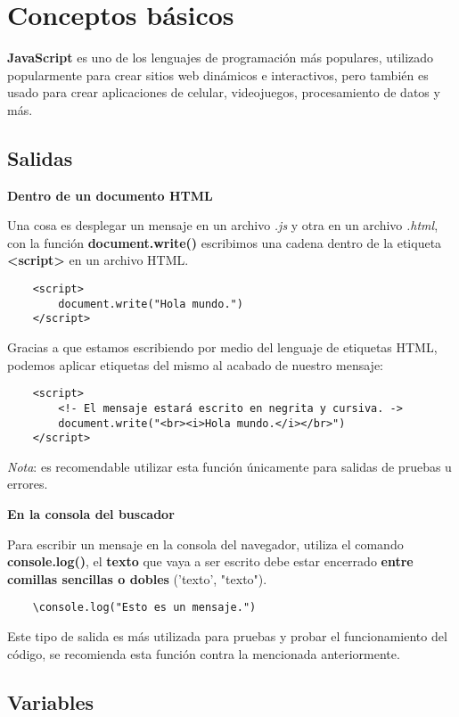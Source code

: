 \section{Conceptos básicos}

\textbf{JavaScript} es uno de los lenguajes de programación más populares, utilizado popularmente para crear sitios web dinámicos e interactivos, pero también es usado para crear aplicaciones de celular, videojuegos, procesamiento de datos y más.


\subsection{Salidas}

\textbf{Dentro de un documento HTML}

Una cosa es desplegar un mensaje en un archivo \textit{.js} y otra en un archivo \textit{.html}, con la función \textbf{document.write()} escribimos una cadena dentro de la etiqueta \textbf{<script>} en un archivo HTML.
\begin{lstlisting}
    <script>
        document.write("Hola mundo.")
    </script>
\end{lstlisting}

Gracias a que estamos escribiendo por medio del lenguaje de etiquetas HTML, podemos aplicar etiquetas del mismo al acabado de nuestro mensaje:
\begin{lstlisting}
    <script>
        <!- El mensaje estará escrito en negrita y cursiva. ->
        document.write("<br><i>Hola mundo.</i></br>")
    </script>
\end{lstlisting}

\textit{Nota}: es recomendable utilizar esta función únicamente para salidas de pruebas u errores.

\textbf{En la consola del buscador}

Para escribir un mensaje en la consola del navegador, utiliza el comando \textbf{console.log()}, el \textbf{texto} que vaya a ser escrito debe estar encerrado \textbf{entre comillas sencillas o dobles} ('texto', "texto").
\begin{lstlisting}
    \console.log("Esto es un mensaje.")
\end{lstlisting}

Este tipo de salida es más utilizada para pruebas y probar el funcionamiento del código, se recomienda esta función contra la mencionada anteriormente.


\subsection{Variables}

